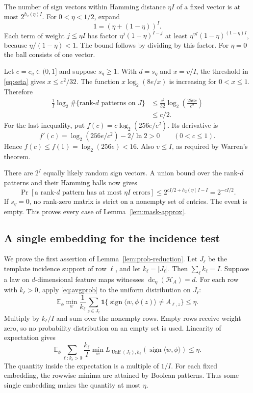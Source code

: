\documentclass[11pt,letterpaper,pmlr,twoside]{jmlr}
\newcommand{\Hc}{\mathcal H}
\newcommand{\E}{\mathbb E}
\newcommand{\one}{\mathbf 1}
\newcommand{\sgn}{\operatorname{sign}}
\newcommand{\dc}{\operatorname{dc}}
\newcommand{\err}{L}
\newcommand{\ip}[2]{\langle #1,#2\rangle}
\newcommand{\hbin}{h_2}
\newcommand{\Unif}{\operatorname{Unif}}
\begin{document}
The number of sign vectors within Hamming distance $\eta I$ of a fixed vector is at most $2^{\hbin(\eta)I}$. For $0<\eta<1/2$, expand
\[
 1=(\eta+(1-\eta))^I.
\]
Each term of weight $j\le\eta I$ has factor $\eta^j(1-\eta)^{I-j}$ at least $\eta^{\eta I}(1-\eta)^{(1-\eta)I}$, because $\eta/(1-\eta)<1$. The bound follows by dividing by this factor. For $\eta=0$ the ball consists of one vector.

Let $c=c_\eta\in(0,1]$ and suppose $s_\eta\ge1$. With $d=s_\eta$ and $x=v/I$, the threshold in \eqref{eq:seta} gives $x\le c^2/32$. The function $x\log_2(8e/x)$ is increasing for $0<x\le1$. Therefore
\begin{align*}
 \frac1I\log_2\#\{\text{rank-}d\text{ patterns on }J\}
 &\le \frac{c^2}{32}\log_2\left(\frac{256e}{c^2}\right)\\
 &\le c/2.
\end{align*}
For the last inequality, put $f(c)=c\log_2(256e/c^2)$. Its derivative is
\[
 f'(c)=\log_2(256e/c^2)-2/\ln2>0\qquad(0<c\le1).
\]
Hence $f(c)\le f(1)=\log_2(256e)<16$. Also $v\le I$, as required by Warren's theorem.

There are $2^I$ equally likely random sign vectors. A union bound over the rank-$d$ patterns and their Hamming balls now gives
\[
 \Pr[\text{a rank-}d\text{ pattern has at most }\eta I\text{ errors}]
 \le 2^{cI/2+\hbin(\eta)I-I}
 =2^{-cI/2}.
\]
If $s_\eta=0$, no rank-zero matrix is strict on a nonempty set of entries. The event is empty. This proves every case of Lemma~\ref{lem:mask-approx}.

\subsection{A single embedding for the incidence test}
We prove the first assertion of Lemma~\ref{lem:prob-reduction}. Let $J_\ell$ be the template incidence support of row $\ell$, and let $k_\ell=|J_\ell|$. Then $\sum_\ell k_\ell=I$. Suppose a law on $d$-dimensional feature maps witnesses $\dc_\eta(\Hc_A)=d$. For each row with $k_\ell>0$, apply \eqref{eq:avgprob} to the uniform distribution on $J_\ell$:
\[
 \E_\phi\min_w\frac1{k_\ell}
 \sum_{z\in J_\ell}\one\{\sgn\ip{w}{\phi(z)}\ne A_{\ell,z}\}
 \le\eta.
\]
Multiply by $k_\ell/I$ and sum over the nonempty rows. Empty rows receive weight zero, so no probability distribution on an empty set is used. Linearity of expectation gives
\begin{equation}
 \E_\phi\sum_{\ell:k_\ell>0}\frac{k_\ell}{I}
 \min_w\err_{\Unif(J_\ell),h_\ell}(\sgn\ip{w}{\phi})
 \le\eta.
\label{eq:weighted-incidence}
\end{equation}
The quantity inside the expectation is a multiple of $1/I$. For each fixed embedding, the rowwise minima are attained by Boolean patterns. Thus some single embedding makes the quantity at most $\eta$.
\end{document}
